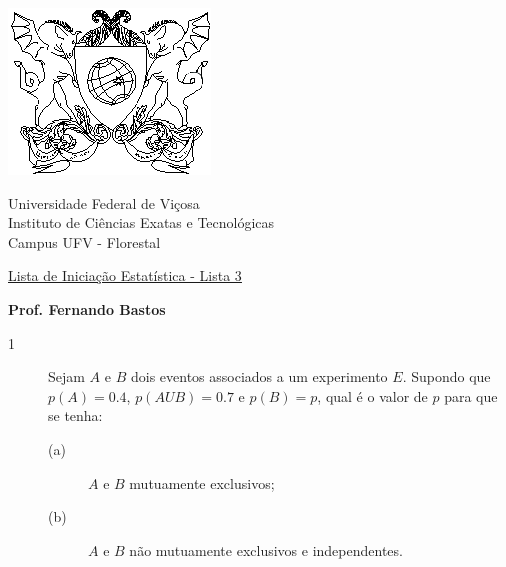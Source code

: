 \documentclass{report}
\begin{document}
\begin{center}
\begin{minipage}[s]{4cm}
\hspace{-1.3cm}\includegraphics[scale=1.0]{Figuras/brasaoufv.eps}
\end{minipage}
\begin{minipage}[s]{13cm}
{\begin{center} {\sc \Large Universidade Federal de Vi\c{c}osa}\\
{\sc \large Instituto de Ci\^encias Exatas e Tecnológicas}\\
{\sc \large Campus UFV - Florestal}\\
\end{center}}
\end{minipage}\begin{minipage}[s]{2 cm}
\end{minipage}
\end{center}

\vspace{-0.3cm}



\medskip

\begin{center}

\underline{\underline{{\large{\sc Lista de Iniciação Estatística - Lista 3}}}}

\bigskip

{\large {\bf Prof. Fernando Bastos}}
%
\end{center}

\begin{description}

\item[{\large 1}] Sejam $A$ e $B$ dois eventos associados a um experimento $E$. Supondo que $p(A) = 0.4$, $p(AUB) = 0.7$ e $p(B) = p$, qual é o valor de $p$ para que se tenha:

\begin{description}

\item[(a)]  { $A$ e $B$ mutuamente exclusivos;}

\item[(b)]  { $A$ e $B$ não mutuamente exclusivos e independentes.}

\end{description}

\end{description}
\end{document}
